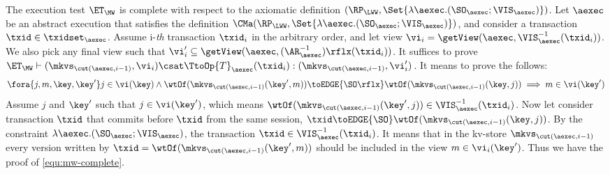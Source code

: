 The execution test $\ET_{\MW}$ is complete with respect to 
the axiomatic definition $(\RP_{\LWW}, \Set{\lambda \aexec.(\SO_{\aexec} ; \VIS_{\aexec})})$. 
Let $\aexec$ be an abstract execution that satisfies the definition
$\CMa(\RP_{\LWW}, \Set{\lambda \aexec.(\SO_{\aexec} ; \VIS_{\aexec})})$, 
and consider a transaction $\txid \in \txidset_{\aexec}$. 
Assume i-\emph{th} transaction \( \txid_i \) in the arbitrary order,
and let view \( \vi_{i} = \getView(\aexec, \VIS^{-1}_{\aexec}(\txid_{i}) ) \).
We also pick any final view such that \( \vi'_{i} \subseteq \getView(\aexec, (\AR^{-1}_{\aexec})\rflx(\txid_{i}) ) \).
It suffices to prove \( \ET_\MW \vdash (\mkvs_{\cut(\aexec, i-1)}, \vi_i ) \csat  \TtoOp{T}_{\aexec}(\txid_{i}) : (\mkvs_{\cut(\aexec, i-1)}, \vi'_{i}) \).
It means to prove the follows:
\begin{equation}
\label{equ:mw-complete}
\begin{array}{@{}l@{}}
    \fora{j,m,\key, \key' } j \in \vi(\key)  
    \land \wtOf(\mkvs_{\cut(\aexec, i-1)}(\key', m)) \toEDGE{\SO\rflx} \wtOf(\mkvs_{\cut(\aexec, i-1)}(\key, j))  
    \implies m \in \vi(\key')
\end{array}
\end{equation}
Assume \( j \) and \( \key' \) such that \( j \in \vi(\key')\), which means \( \wtOf(\mkvs_{\cut(\aexec, i-1)}(\key', j)) \in \VIS^{-1}_{\aexec}(\txid_{i}) \).
Now let consider transaction \( \txid \) that commits before \( \txid \) from the same session, \ie \( \txid \toEDGE{\SO} \wtOf(\mkvs_{\cut(\aexec, i-1)}(\key, j)) \).
By the constraint \( \lambda \aexec.(\SO_{\aexec} ; \VIS_{\aexec}) \), the transaction \( \txid \in \VIS^{-1}_{\aexec}(\txid_{i}) \).
It means that in the kv-store \(  \mkvs_{\cut(\aexec, i-1)} \) every version written by \( \txid =  \wtOf(\mkvs_{\cut(\aexec, i-1)}(\key', m)) \) should be included in the view \( m \in \vi_i(\key') \).
Thus we have the proof of \cref{equ:mw-complete}.
